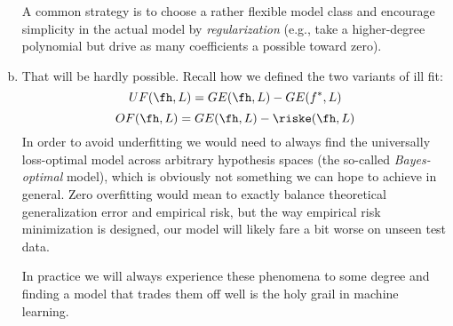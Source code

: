 \begin{enumerate}[a)]
  A common strategy is to choose a rather flexible model class and encourage 
  simplicity in the actual model by \textit{regularization} (e.g., take a 
  higher-degree polynomial but drive as many coefficients a possible toward 
  zero).
  
  \item That will be hardly possible.
  Recall how we defined the two variants of ill fit:
  $$UF(\fh, L) = GE(\fh, L) - GE(f^\ast, L)$$
  $$OF(\fh, L) = GE(\fh, L) - \riske(\fh, L)$$
  In order to avoid underfitting we would need to always find the universally 
  loss-optimal model across arbitrary hypothesis spaces (the so-called 
  \textit{Bayes-optimal} model), which is obviously not something we can hope 
  to achieve in general.
  Zero overfitting would mean to exactly balance theoretical generalization 
  error and empirical risk, but the way empirical risk minimization is designed, 
  our model will likely fare a bit worse on unseen test data.
  
  In practice we will always experience these phenomena to some degree and 
  finding a model that trades them off well is the holy grail in machine 
  learning.
\end{enumerate}
